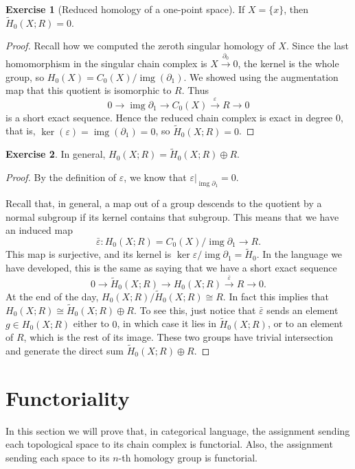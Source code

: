 \documentclass{book}
\theoremstyle{definition}
\newtheorem*{ejer}{Exercise}
\DeclareMathOperator{\img}{img}
\begin{document}
\begin{ejer}[Reduced homology of a one-point space]
If $X=\{x\}$, then $\tilde H_0(X;R)=0$.
\end{ejer}

\begin{proof}
Recall how we computed the zeroth singular homology of $X$.
Since the last homomorphism in the singular chain complex is
$X\xrightarrow{\partial_0}0$, the kernel is the whole group,
so $H_0(X)=C_0(X)/\img(\partial_1)$. We showed using the
augmentation map that this quotient is isomorphic to $R$.
Thus
$$
0\to\img\partial_1\to C_0(X)\xrightarrow{\varepsilon}R\to0
$$
is a short exact sequence. Hence the reduced chain complex is
exact in degree 0, that is,
$\ker(\varepsilon)=\img(\partial_1)=0$, so
$\tilde H_0(X;R)=0$.
\end{proof}

\begin{ejer}
In general, $H_0(X;R)=\tilde H_0(X;R)\oplus R$.
\end{ejer}

\begin{proof}
By the definition of $\varepsilon$, we know that
$\varepsilon|_{\img\partial_1}=0$.

Recall that, in general, a map out of a group descends to the
quotient by a normal subgroup if its kernel contains that
subgroup. This means that we have an induced map
$$
\bar\varepsilon:H_0(X;R)=C_0(X)/\img\partial_1\to R.
$$
This map is surjective, and its kernel is
$\ker\varepsilon/\img\partial_1=\tilde H_0$. In the language
we have developed, this is the same as saying that we have a
short exact sequence
$$
0\to\tilde H_0(X;R)\to H_0(X;R)
\xrightarrow{\bar\varepsilon}R\to0.
$$
At the end of the day,
$H_0(X;R)/\tilde H_0(X;R)\cong R$. In fact this implies that
$H_0(X;R)\cong\tilde H_0(X;R)\oplus R$. To see this, just
notice that $\bar\varepsilon$ sends an element
$g\in H_0(X;R)$ either to $0$, in which case it lies in
$\tilde H_0(X;R)$, or to an element of $R$, which is the rest
of its image. These two groups have trivial intersection and
generate the direct sum $\tilde H_0(X;R)\oplus R$.
\end{proof}

\section{Functoriality}

In this section we will prove that, in categorical language,
the assignment sending each topological space to its chain
complex is functorial. Also, the assignment sending each
space to its $n$-th homology group is functorial.
\end{document}
